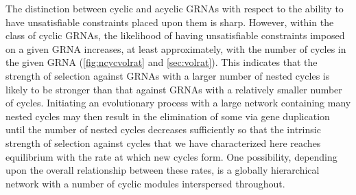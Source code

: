 The distinction between cyclic and acyclic GRNAs with respect to the ability to have unsatisfiable constraints placed upon them is sharp. However, within the class of cyclic GRNAs, the likelihood of having unsatisfiable constraints imposed on a given GRNA increases, at least approximately, with the number of cycles in the given GRNA (\ref{fig:ncycvolrat} and \ref{sec:volrat}). This indicates that the strength of selection against GRNAs with a larger number of nested cycles is likely to be stronger than that against GRNAs with a relatively smaller number of cycles. Initiating an evolutionary process with a large network containing many nested cycles may then result in the elimination of some via gene duplication until the number of nested cycles decreases sufficiently so that the intrinsic strength of selection against cycles that we have characterized here reaches equilibrium with the rate at which new cycles form. One possibility, depending upon the overall relationship between these rates, is a globally hierarchical network with a number of cyclic modules interspersed throughout.
